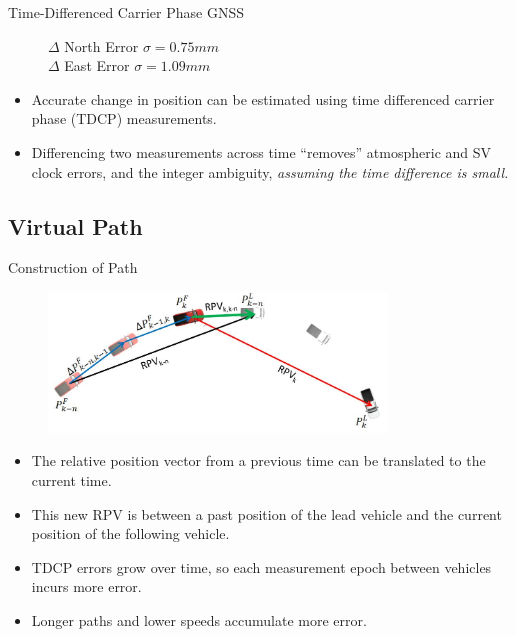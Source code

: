 \documentclass{beamer}
\begin{document}
\begin{frame}{Time-Differenced Carrier Phase GNSS}
\begin{figure}[ht]
\begin{minipage}[b]{0.5\linewidth}
          \caption{\footnotesize $\Delta$ North Error $\sigma=0.75mm$\\$\Delta$ East Error $\sigma=1.09mm$}
        \end{minipage}
      \end{figure}
      \begin{itemize} \footnotesize
        \item Accurate change in position can be estimated using time differenced carrier phase (TDCP) measurements.
        \item Differencing two measurements across time “removes” atmospheric and SV clock errors, and the integer ambiguity, \textit{assuming the time difference is small.}
      \end{itemize}
    \end{frame}


  \subsection{Virtual Path}

    \begin{frame}{Construction of Path}
      \begin{figure}
        \includegraphics[width=9cm]{../graphics/path_algorithm.png}
      \end{figure}
      \vspace{-10pt}
      \begin{itemize} \scriptsize
        \item The relative position vector from a previous time can be translated to the current time.
        \item This new RPV is between a past position of the lead vehicle and the current position of the following vehicle.
        \item TDCP errors grow over time, so each measurement epoch between vehicles incurs more error.
        \item Longer paths and lower speeds accumulate more error.
      \end{itemize}
    \end{frame}
\end{document}
